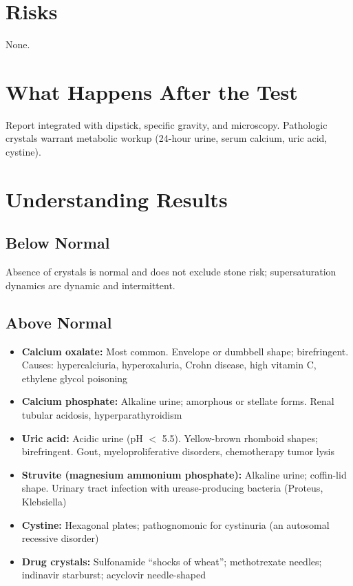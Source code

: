 \section*{Risks}
None.

\section*{What Happens After the Test}
Report integrated with dipstick, specific gravity, and microscopy. Pathologic crystals warrant metabolic workup (24-hour urine, serum calcium, uric acid, cystine).

\section*{Understanding Results}

\subsection*{Below Normal}
Absence of crystals is normal and does not exclude stone risk; supersaturation dynamics are dynamic and intermittent.

\subsection*{Above Normal}
\begin{itemize}
  \item \textbf{Calcium oxalate:} Most common. Envelope or dumbbell shape; birefringent. Causes: hypercalciuria, hyperoxaluria, Crohn disease, high vitamin C, ethylene glycol poisoning
  \item \textbf{Calcium phosphate:} Alkaline urine; amorphous or stellate forms. Renal tubular acidosis, hyperparathyroidism
  \item \textbf{Uric acid:} Acidic urine (pH $<$ 5.5). Yellow-brown rhomboid shapes; birefringent. Gout, myeloproliferative disorders, chemotherapy tumor lysis
  \item \textbf{Struvite (magnesium ammonium phosphate):} Alkaline urine; coffin-lid shape. Urinary tract infection with urease-producing bacteria (Proteus, Klebsiella)
  \item \textbf{Cystine:} Hexagonal plates; pathognomonic for cystinuria (an autosomal recessive disorder)
  \item \textbf{Drug crystals:} Sulfonamide ``shocks of wheat''; methotrexate needles; indinavir starburst; acyclovir needle-shaped
\end{itemize}

